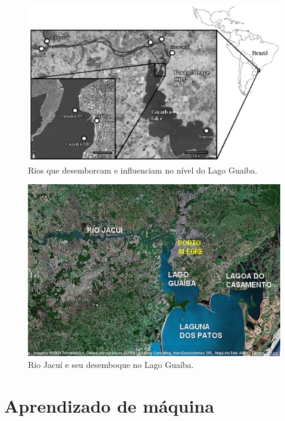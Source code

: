 \begin{figure}[H]
	\caption{\label{fig:bacia_guaiba}Rios que desemborcam e influenciam no nível do Lago Guaíba.}
	\begin{center}
		\includegraphics[scale=0.45]{figuras/bacia_lago_guaiba.png}
	\end{center}
\end{figure}

\begin{figure}[H]
	\caption{\label{fig:bacia_guaiba_2}Rio Jacuí e seu desemboque no Lago Guaíba.}
	\begin{center}
		\includegraphics[scale=0.8]{figuras/lago_guaiba_2.jpg}
	\end{center}
\end{figure}

\section{Aprendizado de máquina}

